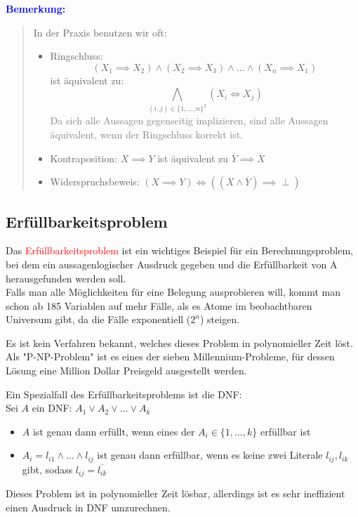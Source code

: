\documentclass{article}
\newcommand{\red}[1]{\textcolor{red}{#1}}
\newcommand{\gray}[1]{\textcolor{gray}{#1}}
\newcommand{\blue}[1]{\textcolor{blue}{#1}}
\newcommand{\an}[1]{\blue{\textbf{Bemerkung: }}\begin{quote}#1\end{quote}}
\newcommand{\n}[1]{\overline{#1}}
\begin{document}
\an{
    In der Praxis benutzen wir oft:
    \begin{itemize}
        \item Ringschluss: 
        \[
            (X_1 \implies X_2) \land (X_2 \implies X_3) \land \dots \land (X_n \implies X_1)
        \]
        ist äquivalent zu:
        \[
            \bigwedge_{(i,j) \in \{1, \dots, n\}^2} (X_i \iff X_j)
        \]
        \gray{Da sich alle Aussagen gegenseitig implizieren, sind alle Aussagen äquivalent, wenn der Ringschluss korrekt ist.}
        \item Kontraposition: \(X \implies Y\) ist äquivalent zu \(\n{Y} \implies \n{X}\)
        \item Widerspruchsbeweis: \((X \implies Y) \iff ((X \land \n{Y}) \implies \perp)\)
    \end{itemize}
}

\subsection{Erfüllbarkeitsproblem}

Das \red{Erfüllbarkeitsproblem} ist ein wichtiges Beispiel für ein Berechnungsproblem, bei dem ein aussagenlogischer Ausdruck gegeben und die Erfüllbarkeit von A herausgefunden werden soll.\\
Falls man alle Möglichkeiten für eine Belegung ausprobieren will, kommt man schon ab 185 Variablen auf mehr Fälle, als es Atome im beobachtbaren Universum gibt, da die Fälle exponentiell ($2^n$) steigen.

Es ist kein Verfahren bekannt, welches dieses Problem in polynomieller Zeit löst.\\
Als "P-NP-Problem" ist es eines der sieben Millennium-Probleme, für dessen Lösung eine Million Dollar Preisgeld ausgestellt werden.


Ein Spezialfall des Erfüllbarkeitsproblems ist die DNF:\\
Sei $A$ ein DNF: \(A_1 \lor A_2 \lor \dots \lor A_k\)
\begin{itemize}
    \item $A$ ist genau dann erfüllt, wenn eines der \(A_i \in \{1, \dots, k\}\) erfüllbar ist
    \item $A_i = l_{i1} \land \dots \land l_{ij}$ ist genau dann erfüllbar, wenn es keine zwei Literale \(l_{ij}, l_{ik}\) gibt, sodass \(l_{ij} = \n{l_{ik}}\)
\end{itemize}
Dieses Problem ist in polynomieller Zeit lösbar, allerdings ist es sehr ineffizient einen Ausdruck in DNF umzurechnen.
\end{document}
